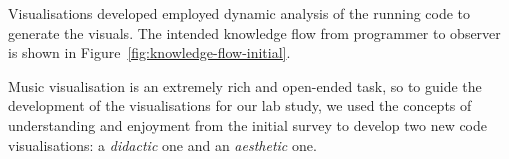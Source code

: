 
Visualisations developed employed dynamic analysis of the running code to generate the visuals. The intended knowledge flow from programmer to observer is shown in Figure~\ref{fig:knowledge-flow-initial}.

Music visualisation is an extremely rich and open-ended task, so to guide the development of the visualisations for our lab study, we used the concepts of understanding and enjoyment from the initial survey to develop two new code visualisations: a \emph{didactic} one and an \emph{aesthetic} one. 

